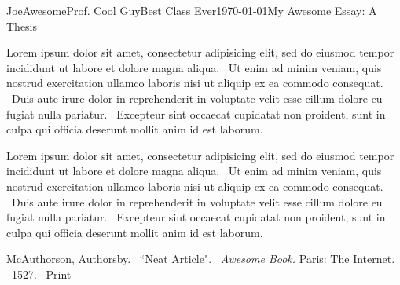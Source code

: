 \documentclass[12pt,letterpaper]{article}
\begin{document}
\begin{mla}{Joe}{Awesome}{Prof. Cool Guy}{Best Class Ever}{\mladate\today}{My Awesome Essay: A Thesis}

Lorem ipsum dolor sit amet, consectetur adipisicing elit, sed do eiusmod tempor incididunt ut labore et dolore magna aliqua. \ Ut enim ad minim veniam, quis nostrud exercitation ullamco laboris nisi ut aliquip ex ea commodo consequat. \ Duis aute irure dolor in reprehenderit in voluptate velit esse cillum dolore eu fugiat nulla pariatur. \ Excepteur sint occaecat cupidatat non proident, sunt in culpa qui officia deserunt mollit anim id est laborum.

Lorem ipsum dolor sit amet, consectetur adipisicing elit, sed do eiusmod tempor incididunt ut labore et dolore magna aliqua. \ Ut enim ad minim veniam, quis nostrud exercitation ullamco laboris nisi ut aliquip ex ea commodo consequat. \ Duis aute irure dolor in reprehenderit in voluptate velit esse cillum dolore eu fugiat nulla pariatur. \ Excepteur sint occaecat cupidatat non proident, sunt in culpa qui officia deserunt mollit anim id est laborum.

\begin{workscited}
%
\bibent
McAuthorson, Authorsby. \ ``Neat Article". \ \textit{Awesome Book.} Paris: The Internet. \ 1527. \ Print

\end{workscited}
\end{mla}
\end{document}
